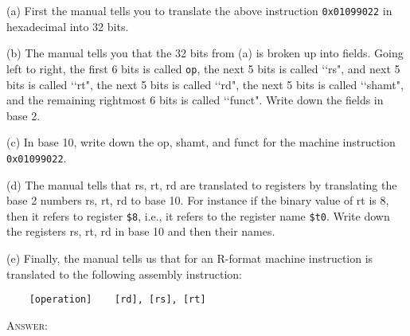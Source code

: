 (a) First the manual tells you to translate the above instruction
\verb!0x01099022! in hexadecimal into 32 bits.

(b) The manual tells you that the 32 bits from (a) is broken up into fields.
Going left to right, the first 6 bits is called \verb!op!,
the next 5 bits is called \lq\lq rs", and next 5 bits is called
\lq\lq rt", the next 5 bits is called \lq\lq rd",
the next 5 bits is called \lq\lq shamt", and the remaining rightmost 6 bits is
called \lq\lq funct". Write down the fields in base 2.

(c) In base 10, write down the op, shamt, and funct for the machine
instruction \verb!0x01099022!.

(d) The manual tells that rs, rt, rd are translated to registers by translating
the base 2 numbers rs, rt, rd to base 10.
For instance if the binary value of rt is 8, then it refers to register
\verb!$8!, i.e., it refers to the register name \verb!$t0!.
Write down the registers rs, rt, rd in base 10 and then their names.

(e) Finally, the manual tells us that for an R-format machine instruction is translated to the following assembly instruction:
\begin{Verbatim}
    [operation]    [rd], [rs], [rt]
\end{Verbatim}
\textsc{Answer:}

